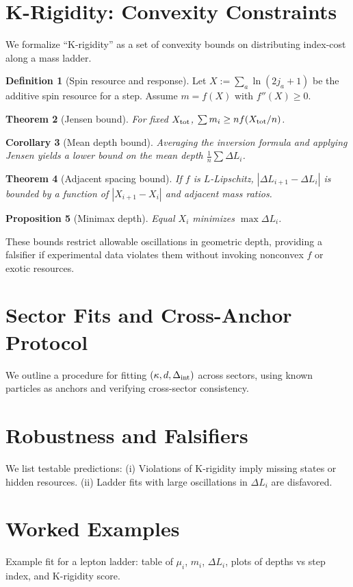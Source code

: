 \documentclass[11pt]{article}
\theoremstyle{plain}
\newtheorem{theorem}{Theorem}[section]
\newtheorem{proposition}[theorem]{Proposition}
\newtheorem{corollary}[theorem]{Corollary}
\theoremstyle{definition}
\newtheorem{definition}[theorem]{Definition}
\begin{document}
\section{K-Rigidity: Convexity Constraints}
We formalize ``K-rigidity'' as a set of convexity bounds on distributing index-cost along a mass ladder.
\begin{definition}[Spin resource and response]
  Let $X := \sum_a \ln(2j_a+1)$ be the additive spin resource for a step. Assume $m = f(X)$ with $f''(X)\ge 0$.
\end{definition}
\begin{theorem}[Jensen bound]
  For fixed $X_{\rm tot}$, $\sum m_i \ge n f(X_{\rm tot}/n)$.
\end{theorem}
\begin{corollary}[Mean depth bound]
  Averaging the inversion formula and applying Jensen yields a lower bound on the mean depth $\frac{1}{n}\sum \Delta L_i$.
\end{corollary}
\begin{theorem}[Adjacent spacing bound]
  If $f$ is $L$-Lipschitz, $|\Delta L_{i+1}-\Delta L_i|$ is bounded by a function of $|X_{i+1}-X_i|$ and adjacent mass ratios.
\end{theorem}
\begin{proposition}[Minimax depth]
  Equal $X_i$ minimizes $\max \Delta L_i$.
\end{proposition}
These bounds restrict allowable oscillations in geometric depth, providing a falsifier if experimental data violates them without invoking nonconvex $f$ or exotic resources.

\section{Sector Fits and Cross-Anchor Protocol}
We outline a procedure for fitting $(\kappa,d,\Delta_{\rm int})$ across sectors, using known particles as anchors and verifying cross-sector consistency.

\section{Robustness and Falsifiers}
We list testable predictions: (i) Violations of K-rigidity imply missing states or hidden resources. (ii) Ladder fits with large oscillations in $\Delta L_i$ are disfavored.

\section{Worked Examples}
Example fit for a lepton ladder: table of $\mu_i$, $m_i$, $\Delta L_i$, plots of depths vs step index, and K-rigidity score.
\end{document}

